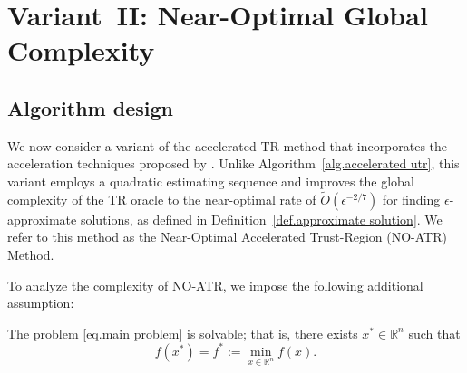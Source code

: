 \documentclass{mcom-l}
\numberwithin{equation}{section}
\begin{document}
\section{Variant~II: Near-Optimal Global Complexity}\label{sec.second variant}
\subsection{Algorithm design}
We now consider a variant of the accelerated TR method that incorporates the acceleration techniques proposed by \citet{monteiro2013accelerated}. Unlike Algorithm~\ref{alg.accelerated utr}, this variant employs a quadratic estimating sequence and improves the global complexity of the TR oracle to the near-optimal rate of $\tilde O(\epsilon^{-2/7})$ for finding $\epsilon$-approximate solutions, as defined in Definition~\ref{def.approximate solution}. We refer to this method as the Near-Optimal Accelerated Trust-Region (NO-ATR) Method.

To analyze the complexity of NO-ATR, we impose the following additional assumption:

\begin{assumption}
    \label{assm.solvable}
    The problem \eqref{eq.main problem} is solvable; that is, there exists $x^* \in \mathbb{R}^n$ such that
    \begin{equation*}
        f(x^*) = f^*:= \min_{x \in \mathbb{R}^n} f(x).
    \end{equation*}
\end{assumption}
\end{document}
